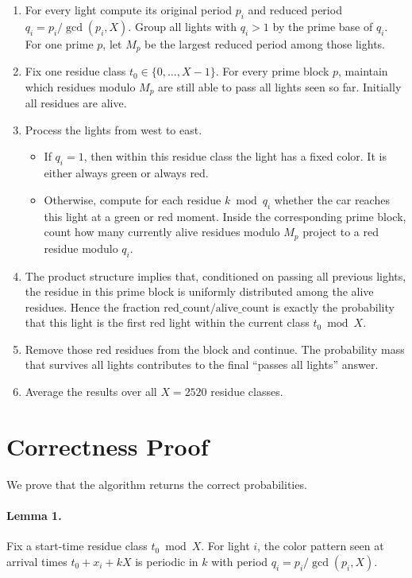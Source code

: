 \documentclass[11pt]{article}
\begin{document}
\begin{enumerate}[leftmargin=*]
    \item For every light compute its original period $p_i$ and reduced period
    $q_i = p_i / \gcd(p_i, X)$.
    Group all lights with $q_i > 1$ by the prime base of $q_i$.
    For one prime $p$, let $M_p$ be the largest reduced period among those lights.
    \item Fix one residue class $t_0 \in \{0,\dots,X-1\}$.
    For every prime block $p$, maintain which residues modulo $M_p$ are still able to pass all lights
    seen so far. Initially all residues are alive.
    \item Process the lights from west to east.
    \begin{itemize}[leftmargin=*]
        \item If $q_i = 1$, then within this residue class the light has a fixed color.
        It is either always green or always red.
        \item Otherwise, compute for each residue $k \bmod q_i$ whether the car reaches this light at
        a green or red moment.
        Inside the corresponding prime block, count how many currently alive residues modulo $M_p$
        project to a red residue modulo $q_i$.
    \end{itemize}
    \item The product structure implies that, conditioned on passing all previous lights, the residue in
    this prime block is uniformly distributed among the alive residues. Hence the fraction
    $\text{red\_count}/\text{alive\_count}$ is exactly the probability that this light is the first red light
    within the current class $t_0 \bmod X$.
    \item Remove those red residues from the block and continue. The probability mass that survives all
    lights contributes to the final ``passes all lights'' answer.
    \item Average the results over all $X=2520$ residue classes.
\end{enumerate}

\section*{Correctness Proof}

We prove that the algorithm returns the correct probabilities.

\paragraph{Lemma 1.}
Fix a start-time residue class $t_0 \bmod X$.
For light $i$, the color pattern seen at arrival times $t_0 + x_i + kX$ is periodic in $k$ with period
$q_i = p_i / \gcd(p_i, X)$.
\end{document}
